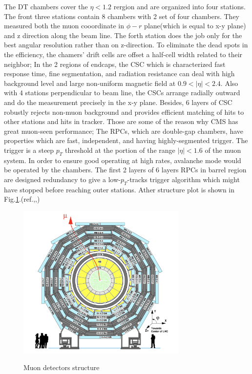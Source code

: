 		The DT chambers cover the $\eta < 1.2$ rergion and are organized into four stations. The front three stations contain 8 chambers with 2 set of four chambers. They measured both the muon cooordinate in $\phi - r$ plane(which is equal to x-y plane) and z direction along the beam line. The forth station does the job only for the best angular resolution rather than on z-direction. To eliminate the dead spots in the efficiency, the chamers' drift cells are offset a half-cell width related to their neighbor; In the 2 regions of endcaps, the CSC which is characterized fast response time, fine segmentation, and radiation resistance can deal with high background level and large non-uniform magnetic field at $0.9 < |\eta| < 2.4$. Also with 4 stations perpendicular to beam line, the CSCs arrange radially outward and do the measurement precisely in the x-y plane. Besides, 6 layers of CSC robustly rejects non-muon background and provides efficient matching of hits to other stations and hits in tracker. Those are some of the reason why CMS has great muon-seen performance; The RPCs, which are double-gap chambers, have properties which are fast, independent, and having highly-segmented trigger. The trigger is a steep $p_T$ threshold at the portion of the range $|\eta| < 1.6$ of the muon system. In order to ensure good operating at high rates, avalanche mode would be operated by the chambers. The first 2 layers of 6 layers RPCs in barrel region are designed redundancy to give a low-$p_T$-tracks trigger algorithm which might have stopped before reaching outer stations. Ather structure plot is shown in Fig.\ref{ExpApp:fig:muon_chamber2}.(ref.\cite{Chatrchyan:2008aa},\cite{Chatrchyan:2013sba},\cite{Sirunyan:2018fpa})
		
		\begin{figure}[H]
		\centering{}
	    	\includegraphics[width=0.75\textwidth]{Figures/ExpApparatus/muon_chamber2.png}\\
		\caption{Muon detectors structure\cite{Chatrchyan:2008aa}}
		\label{ExpApp:fig:muon_chamber2}
		\end{figure}





